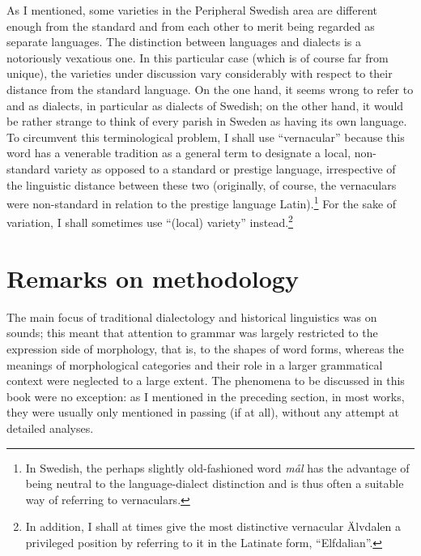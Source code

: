 
As I mentioned, some varieties in the Peripheral Swedish area are different enough from the standard and from each other to merit being regarded as separate languages. The distinction between languages and dialects is a notoriously vexatious one. In this particular case (which is of course far from unique), the varieties under discussion vary considerably with respect to their distance from the standard language. On the one hand, it seems wrong to refer to  and as dialects, in particular as dialects of Swedish; on the other hand, it would be rather strange to think of every parish in Sweden as having its own language. To circumvent this terminological problem, I shall use “vernacular” because this word has a venerable tradition as a general term to designate a local, non-standard variety as opposed to a standard or prestige language, irrespective of the linguistic distance between these two (originally, of course, the vernaculars were non-standard in relation to the prestige language Latin).\footnote{ In Swedish, the perhaps slightly old-fashioned word \textit{mål} has the advantage of being neutral to the language-dialect distinction and is thus often a suitable way of referring to vernaculars. } For the sake of variation, I shall sometimes use “(local) variety” instead.\footnote{ In addition, I shall at times give the most distinctive vernacular Älvdalen a privileged position by referring to it in the Latinate form, “Elfdalian”.}


\section{Remarks on methodology}

The main focus of traditional dialectology and historical linguistics was on sounds; this meant that attention to grammar was largely restricted to the expression side of morphology, that is, to the shapes of word forms, whereas the meanings of morphological categories and their role in a larger grammatical context were neglected to a large extent. The phenomena to be discussed in this book were no exception: as I mentioned in the preceding section, in most works, they were usually only mentioned in passing (if at all), without any attempt at detailed analyses.

